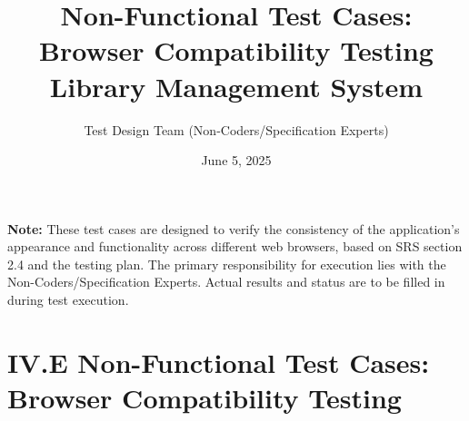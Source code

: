 \documentclass[10pt, a4paper]{report}
\title{Non-Functional Test Cases: Browser Compatibility Testing \\ \large Library Management System}
\author{Test Design Team (Non-Coders/Specification Experts)}
\date{June 5, 2025}
\begin{document}
\maketitle
\begin{center}
    \textbf{Note:} These test cases are designed to verify the consistency of the application's appearance and functionality across different web browsers, based on SRS section 2.4  and the testing plan. The primary responsibility for execution lies with the Non-Coders/Specification Experts. Actual results and status are to be filled in during test execution.
\end{center}

\section*{IV.E Non-Functional Test Cases: Browser Compatibility Testing}
\end{document}
